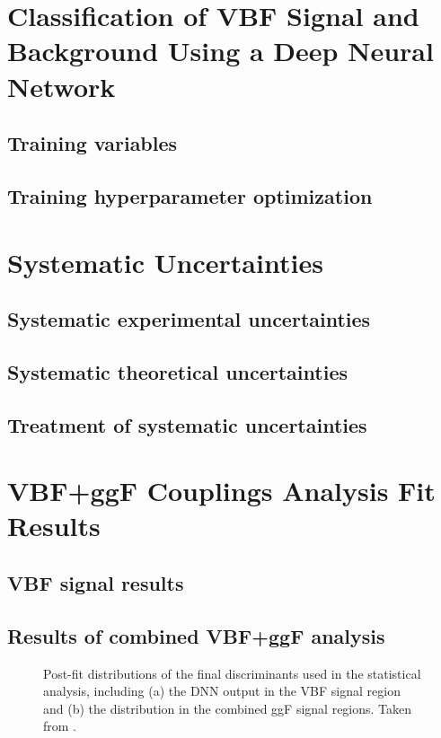 \section{Classification of VBF Signal and Background Using a Deep Neural Network}
\subsection{Training variables}
\subsection{Training hyperparameter optimization}

\section{Systematic Uncertainties}
\subsection{Systematic experimental uncertainties}
\subsection{Systematic theoretical uncertainties}
\subsection{Treatment of systematic uncertainties}

\section{\HWW VBF+ggF Couplings Analysis Fit Results}
\subsection{VBF signal results}

\subsection{Results of combined VBF+ggF analysis}

\begin{figure}
    \caption{Post-fit distributions of the final discriminants used in the statistical analysis, including (a) the DNN output in the VBF signal region and (b) the \mT distribution in the combined ggF signal regions. Taken from .}
    \label{fig:post-fit-final-discriminatns}
\end{figure}

